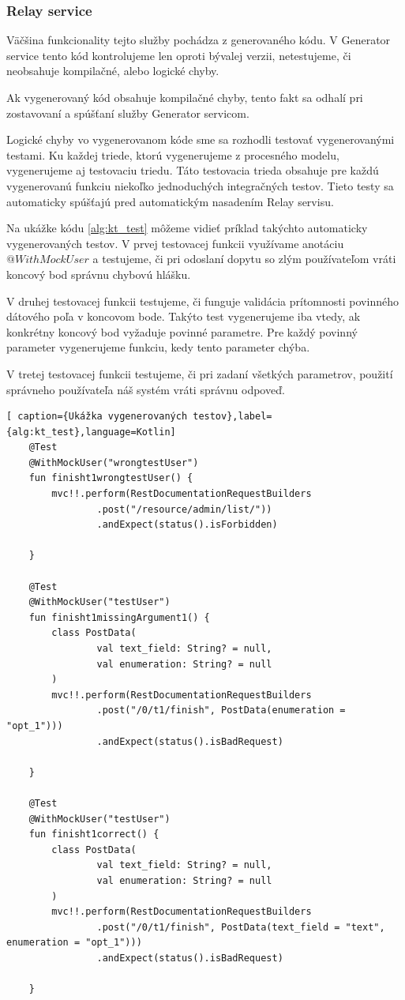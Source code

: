 \subsubsection{Relay service}
Väčšina funkcionality tejto služby pochádza z generovaného kódu. V Generator service tento kód kontrolujeme len oproti bývalej verzii, netestujeme, či neobsahuje kompilačné, alebo logické chyby. 

Ak vygenerovaný kód obsahuje kompilačné chyby, tento fakt sa odhalí pri zostavovaní a spúšťaní služby Generator servicom. 

Logické chyby vo vygenerovanom kóde sme sa rozhodli testovať vygenerovanými testami. Ku každej triede, ktorú vygenerujeme z procesného modelu, vygenerujeme aj testovaciu triedu. Táto testovacia trieda obsahuje  pre každú vygenerovanú funkciu niekoľko jednoduchých integračných testov.  
Tieto testy sa automaticky spúšťajú pred automatickým nasadením Relay servisu. 

Na ukážke kódu \ref{alg:kt_test} môžeme vidieť príklad takýchto automaticky vygenerovaných testov. V prvej testovacej funkcii využívame anotáciu $@WithMockUser$ a testujeme, či pri odoslaní dopytu so zlým používateľom vráti koncový bod správnu chybovú hlášku.

V druhej testovacej funkcii testujeme, či funguje validácia prítomnosti povinného dátového poľa v koncovom bode. Takýto test vygenerujeme iba vtedy, ak konkrétny koncový bod vyžaduje povinné parametre. Pre každý povinný parameter vygenerujeme funkciu, kedy tento parameter chýba. 

V tretej testovacej funkcii testujeme, či pri zadaní všetkých parametrov, použití správneho používateľa náš systém vráti správnu odpoveď.

\begin{lstlisting}[ caption={Ukážka vygenerovaných testov},label={alg:kt_test},language=Kotlin]
    @Test
    @WithMockUser("wrongtestUser")
    fun finisht1wrongtestUser() {
        mvc!!.perform(RestDocumentationRequestBuilders
                .post("/resource/admin/list/"))
                .andExpect(status().isForbidden)

    }

    @Test
    @WithMockUser("testUser")
    fun finisht1missingArgument1() {
        class PostData(
                val text_field: String? = null,
                val enumeration: String? = null
        )
        mvc!!.perform(RestDocumentationRequestBuilders
                .post("/0/t1/finish", PostData(enumeration = "opt_1")))
                .andExpect(status().isBadRequest)

    }

    @Test
    @WithMockUser("testUser")
    fun finisht1correct() {
        class PostData(
                val text_field: String? = null,
                val enumeration: String? = null
        )
        mvc!!.perform(RestDocumentationRequestBuilders
                .post("/0/t1/finish", PostData(text_field = "text", enumeration = "opt_1")))
                .andExpect(status().isBadRequest)

    }
\end{lstlisting}

